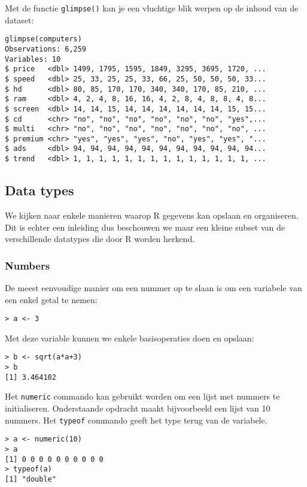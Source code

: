 Met de functie \texttt{glimpse()} kan je een vluchtige blik werpen op de inhoud van de dataset:

\begin{lstlisting}
glimpse(computers)
Observations: 6,259
Variables: 10
$ price   <dbl> 1499, 1795, 1595, 1849, 3295, 3695, 1720, ...
$ speed   <dbl> 25, 33, 25, 25, 33, 66, 25, 50, 50, 50, 33...
$ hd      <dbl> 80, 85, 170, 170, 340, 340, 170, 85, 210, ...
$ ram     <dbl> 4, 2, 4, 8, 16, 16, 4, 2, 8, 4, 8, 8, 4, 8...
$ screen  <dbl> 14, 14, 15, 14, 14, 14, 14, 14, 14, 15, 15...
$ cd      <chr> "no", "no", "no", "no", "no", "no", "yes",...
$ multi   <chr> "no", "no", "no", "no", "no", "no", "no", ...
$ premium <chr> "yes", "yes", "yes", "no", "yes", "yes", "...
$ ads     <dbl> 94, 94, 94, 94, 94, 94, 94, 94, 94, 94, 94...
$ trend   <dbl> 1, 1, 1, 1, 1, 1, 1, 1, 1, 1, 1, 1, 1, 1, ...
\end{lstlisting}

\subsection{Data types}

We kijken naar enkele manieren waarop R gegevens kan opslaan en organiseren. Dit is echter een inleiding dus beschouwen we maar een kleine subset van de verschillende datatypes die door R worden herkend. 

\subsubsection{Numbers}

De meest eenvoudige manier om een nummer op te slaan is om een variabele van een enkel getal te nemen:

\begin{lstlisting}
> a <- 3
\end{lstlisting}

Met deze variable kunnen we enkele basisoperaties doen en opslaan:

\begin{lstlisting}
> b <- sqrt(a*a+3)
> b
[1] 3.464102
\end{lstlisting}

Het \texttt{numeric} commando kan gebruikt worden om een lijst met nummers te initialiseren. Onderstaande opdracht maakt bijvoorbeeld een lijst van 10 nummers. Het \texttt{typeof} commando geeft het type terug van de variabele.

\begin{lstlisting}
> a <- numeric(10)
> a
[1] 0 0 0 0 0 0 0 0 0 0
> typeof(a)
[1] "double"
\end{lstlisting}

